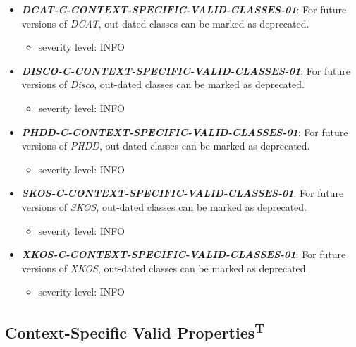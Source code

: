 \documentclass{llncs}
\begin{document}
\begin{itemize}
	\item \textbf{{\em DCAT-C-CONTEXT-SPECIFIC-VALID-CLASSES-01}}: For future versions of \emph{DCAT}, out-dated classes can be marked as deprecated.
	\begin{itemize}
		\item severity level: INFO
	\end{itemize}
\end{itemize}

\begin{itemize}
	\item \textbf{{\em DISCO-C-CONTEXT-SPECIFIC-VALID-CLASSES-01}}: For future versions of \emph{Disco}, out-dated classes can be marked as deprecated.
	\begin{itemize}
		\item severity level: INFO
	\end{itemize}
\end{itemize}

\begin{itemize}
	\item \textbf{{\em PHDD-C-CONTEXT-SPECIFIC-VALID-CLASSES-01}}: For future versions of \emph{PHDD}, out-dated classes can be marked as deprecated.
	\begin{itemize}
		\item severity level: INFO
	\end{itemize}
\end{itemize}

\begin{itemize}
	\item \textbf{{\em SKOS-C-CONTEXT-SPECIFIC-VALID-CLASSES-01}}: For future versions of \emph{SKOS}, out-dated classes can be marked as deprecated.
	\begin{itemize}
		\item severity level: INFO
	\end{itemize}
\end{itemize}

\begin{itemize}
	\item \textbf{{\em XKOS-C-CONTEXT-SPECIFIC-VALID-CLASSES-01}}: For future versions of \emph{XKOS}, out-dated classes can be marked as deprecated.
	\begin{itemize}
		\item severity level: INFO
	\end{itemize}
\end{itemize}

\subsection{Context-Specific Valid Properties\textsuperscript{T}}
\end{document}
